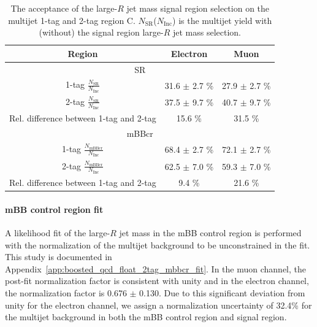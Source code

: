 \begin{table}[!htbp]
\begin{center}
\begin{tabular}{c|c|c}
\hline
Region    & Electron          & Muon      \\
\hline
\multicolumn{3}{c}{SR} \\
\hline
1-tag $\frac{N_\text{SR}}{N_\text{Inc}}$ &  31.6 $\pm$ 2.7 \% & 27.9 $\pm$ 2.7 \% \\
2-tag $\frac{N_\text{SR}}{N_\text{Inc}}$ &  37.5 $\pm$ 9.7 \% & 40.7 $\pm$ 9.7 \% \\
\hline \hline
Rel. difference between 1-tag and 2-tag & 15.6 \% & 31.5 \% \\
\hline
\multicolumn{3}{c}{mBBcr} \\
\hline
1-tag $\frac{N_\text{mBBcr}}{N_\text{Inc}}$ &  68.4 $\pm$ 2.7  \% & 72.1 $\pm$ 2.7 \% \\
2-tag $\frac{N_\text{mBBcr}}{N_\text{Inc}}$ &  62.5 $\pm$ 7.0  \% & 59.3 $\pm$ 7.0 \% \\
\hline \hline
Rel. difference between 1-tag and 2-tag &  9.4 \% &   21.6 \% \\
\end{tabular}
\end{center}
\caption{The acceptance of the large-$R$ jet mass signal region selection on the multijet
1-tag and 2-tag region C. $N_\text{SR}$($N_\text{Inc}$) is the multijet yield
with (without) the signal region large-$R$ jet mass selection.}
\label{tab:boosted_syst_qcd_norm_mBBAcc}
\end{table}
 
\paragraph{mBB control region fit} 
 A likelihood fit of the large-$R$ jet mass in the mBB control region
is performed with the normalization of the multijet background to be unconstrained in the fit.
This study is documented in Appendix~\ref{app:boosted_qcd_float_2tag_mbbcr_fit}. In the muon channel,
the post-fit normalization factor is consistent with unity and in the electron channel,
the normalization factor is 0.676 $\pm$ 0.130. Due to this significant deviation from unity for the electron channel,
we assign a normalization uncertainty of 32.4\% for the multijet background in both the mBB control
region and signal region.
 
